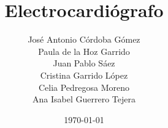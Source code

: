 	\title{Electrocardiógrafo}
	\author[José, Paula, Pablo, Cristina, Celia, Ana ]{
			José Antonio Córdoba Gómez \\
			Paula de la Hoz Garrido \\
			Juan Pablo Sáez \\
			Cristina Garrido López \\
			Celia Pedregosa Moreno \\	
			Ana Isabel Guerrero Tejera
			}
	\date{\today}
	
\frame{\titlepage}
